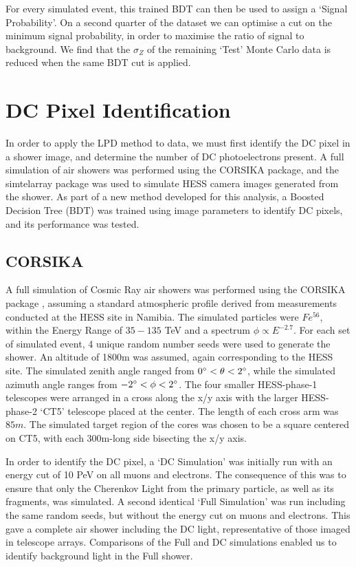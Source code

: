 \documentclass{article}
\begin{document}
For every simulated event, this trained BDT can then be used to assign a \textquoteleft Signal Probability'. On a second quarter of the dataset we can optimise a cut on the minimum signal probability, in order to maximise the ratio of signal to background. We find that the $\sigma_{Z}$ of the remaining \textquoteleft Test' Monte Carlo data is reduced when the same BDT cut is applied.

\section{DC Pixel Identification}
In order to apply the LPD method to data, we must first identify the DC pixel in a shower image, and determine the number of DC photoelectrons present. A full simulation of air showers was performed using the CORSIKA package, and the sim\textunderscore telarray package was used to simulate HESS camera images generated from the shower. As part of a new method developed for this analysis, a Boosted Decision Tree (BDT) was trained using image parameters to identify DC pixels, and its performance was tested.

\subsection{CORSIKA}
A full simulation of Cosmic Ray air showers was performed using the CORSIKA package \cite{Heck98}, assuming a standard atmospheric profile derived from measurements conducted at the HESS site in Namibia. The simulated particles were $Fe^{56}$, within the Energy Range of $35-135$ TeV and a spectrum $\phi \propto E^{-2.7}$. For each set of simulated event, 4 unique random number seeds were used to generate the shower. An altitude of 1800m was assumed, again corresponding to the HESS site. The simulated zenith angle ranged from $0\degree < \theta < 2 \degree$, while the simulated azimuth angle ranges from $-2\degree < \phi < 2 \degree$. The four smaller HESS-phase-1 telescopes were arranged in a cross along the x/y axis with the larger HESS-phase-2 \textquoteleft CT5' telescope placed at the center. The length of each cross arm was $85m$. The simulated target region of the cores was chosen to be a square centered on CT5, with each 300m-long side bisecting the x/y axis.

In order to identify the DC pixel, a \textquoteleft DC Simulation' was initially run with an energy cut of 10 PeV on all muons and electrons. The consequence of this was to ensure that only the Cherenkov Light from the primary particle, as well as its fragments, was simulated. A second identical \textquoteleft Full Simulation' was run including the same random seeds, but without the energy cut on muons and electrons. This gave a complete air shower including the DC light, representative of those imaged in telescope arrays. Comparisons of the Full and DC simulations enabled us to identify background light in the Full shower.
\end{document}
